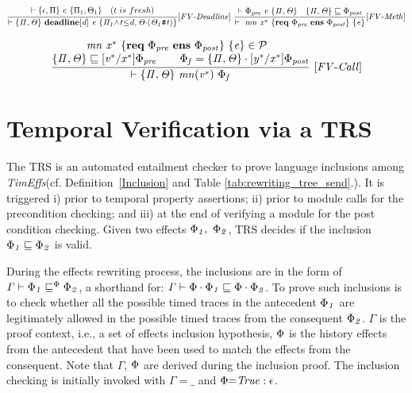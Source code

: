 \documentclass[acmsmall,10pt,review]{acmart}
\newcommand{\timedEffects}{\emph{TimEffs}}
\newcommand{\effect}{\textcolor{black}{\ensuremath{\mathrm{\Phi}}}}
\newcommand{\code}[1]{{\tt{\ensuremath{\m{#1}}}}}
\newcommand{\empt}{\textcolor{black}{\ensuremath{\epsilon}}}
\newcommand{\CONTAIN}{\sqsubseteq}
\newcommand{\m}{\mathit}
\newcommand{\mysharp}{{\mathrel{\texttt{\#}}}}
\newcommand\tabref[1]{Table \textcolor{black}{\ref{#1}}.}
\newcommand\defref[1]{Definition~\textcolor{blue}{\ref{#1}}}
\begin{document}
{{{\small\begin{gather*}
  \code{\frac{
    \begin{matrix}
      \vdash \{ \epsilon, \Pi \}\ e \ \{  \Pi_1, \Theta_1\} 
  \quad (t\ is\ fresh)     
\end{matrix}
  }
  {\vdash \s{ \Pi, \Theta} \  
  \textbf{deadline}  [d] \ e 
   \ \s{\Pi_1 {\wedge}t{\leq}d, \Theta {\cdot}(\Theta_1\mysharp t)} }   
    {[FV\text{-}Deadline]}} 
\ 
\code{\frac{  \vdash \effect_{pre} 
 \ e \  \{ \Pi, \Theta \} \quad   \{ \Pi, \Theta \} \CONTAIN  
  \effect_{post}}{  \vdash  \ mn  \ {x^*}\ \{\textbf{req}\ \effect_{pre}\ 
  \textbf{ens}\  \effect_{post}\} \ \{ e \}}   {[FV\text{-}Meth]}}  
  \end{gather*}}}




{{\small\begin{gather*}
\code{\frac{
\begin{matrix}
{\code{  mn  \ {x^*}\ \{\textbf{req}\ \effect_{pre}\ \textbf{ens}\  \effect_{post}\} \ \{ e \} \in \mathcal{P}\ \ }}
\\
\text{\code{ \s{ \Pi, \Theta} \CONTAIN [v^*/x^*] \effect_{pre}   
\qquad   \effect_f =  \s{ \Pi, \Theta} \cdot  [y^*/x^*]\effect_{post}}}
\end{matrix}}
{\vdash \s{ \Pi, \Theta} \ mn({v^*})  \ 
\effect_f} \ {[FV\text{-}Call]}}
\end{gather*}}}



\section{Temporal Verification via a TRS}
\label{sec:Entailment_Prover}


The TRS  is an automated entailment checker to prove language inclusions among \timedEffects (cf. \defref{Inclusion} and \tabref{tab:rewriting_tree_send}). It is triggered i) prior to temporal property assertions; ii) prior to module calls for the precondition checking; and iii) at the end of verifying a module for the post condition checking. Given two effects \code{\effect_1,\ \effect_2}, TRS decides if the inclusion \code{\effect_1 \CONTAIN  \effect_2 } is valid. 

During the effects rewriting process, the inclusions are in the form of \code{\Gamma \vdash  \effect_1 \CONTAIN^{\effect}  \effect_2 }, a shorthand for: \code{\Gamma \vdash  \effect \cdot \effect_1 \CONTAIN   \effect \cdot  \effect_2}. To prove such inclusions is to check whether all the possible timed traces in the antecedent \code{\effect_1} are legitimately allowed  in the possible timed traces from the consequent \code{\effect_2}.
\code{\Gamma} is the proof context, i.e., a set of effects inclusion hypothesis, \code{\effect} is the history effects from the antecedent that have been used to match the effects from the consequent.
Note that \code{\Gamma}, \code{\effect} are derived during the inclusion proof. 
The inclusion checking is initially invoked with \code{\Gamma{=}\_} and \code{\effect{=} True : \empt}. 







}
\end{document}
